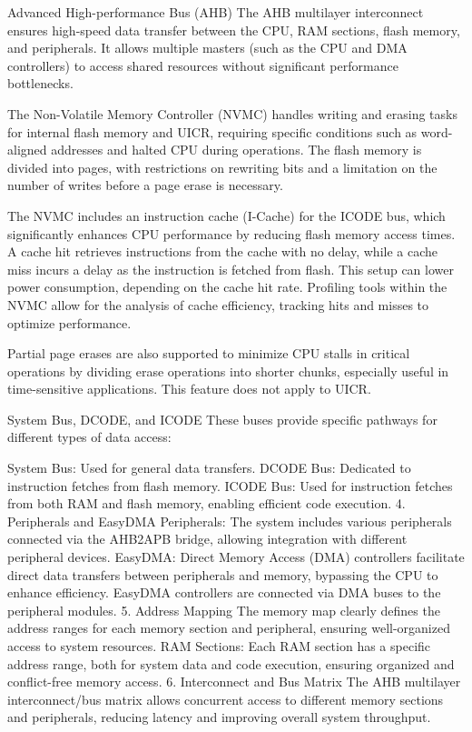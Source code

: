 \documentclass{Configuration_Files/PoliMi3i_thesis}
\begin{document}
Advanced High-performance Bus (AHB)
The AHB multilayer interconnect ensures high-speed data transfer between the CPU, RAM sections, flash memory, and peripherals. It allows multiple masters (such as the CPU and DMA controllers) to access shared resources without significant performance bottlenecks.

The Non-Volatile Memory Controller (NVMC) handles writing and erasing tasks for internal flash memory and UICR, requiring specific conditions such as word-aligned addresses and halted CPU during operations. The flash memory is divided into pages, with restrictions on rewriting bits and a limitation on the number of writes before a page erase is necessary.

The NVMC includes an instruction cache (I-Cache) for the ICODE bus, which significantly enhances CPU performance by reducing flash memory access times. A cache hit retrieves instructions from the cache with no delay, while a cache miss incurs a delay as the instruction is fetched from flash. This setup can lower power consumption, depending on the cache hit rate. Profiling tools within the NVMC allow for the analysis of cache efficiency, tracking hits and misses to optimize performance.

Partial page erases are also supported to minimize CPU stalls in critical operations by dividing erase operations into shorter chunks, especially useful in time-sensitive applications. This feature does not apply to UICR.

System Bus, DCODE, and ICODE
These buses provide specific pathways for different types of data access:

System Bus: Used for general data transfers.
DCODE Bus: Dedicated to instruction fetches from flash memory.
ICODE Bus: Used for instruction fetches from both RAM and flash memory, enabling efficient code execution.
4. Peripherals and EasyDMA
Peripherals: The system includes various peripherals connected via the AHB2APB bridge, allowing integration with different peripheral devices.
EasyDMA: Direct Memory Access (DMA) controllers facilitate direct data transfers between peripherals and memory, bypassing the CPU to enhance efficiency. EasyDMA controllers are connected via DMA buses to the peripheral modules.
5. Address Mapping
The memory map clearly defines the address ranges for each memory section and peripheral, ensuring well-organized access to system resources.
RAM Sections: Each RAM section has a specific address range, both for system data and code execution, ensuring organized and conflict-free memory access.
6. Interconnect and Bus Matrix
The AHB multilayer interconnect/bus matrix allows concurrent access to different memory sections and peripherals, reducing latency and improving overall system throughput.
\end{document}
